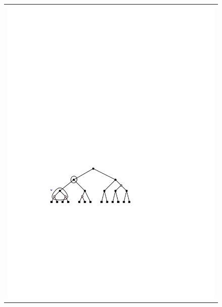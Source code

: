 \begin{figure}
	\begin{center}
		\begin{tabular}{c}
			\includegraphics[scale=0.90909]{figs/rb-split-1} \\

\end{tabular}
\end{center}
\end{figure}
